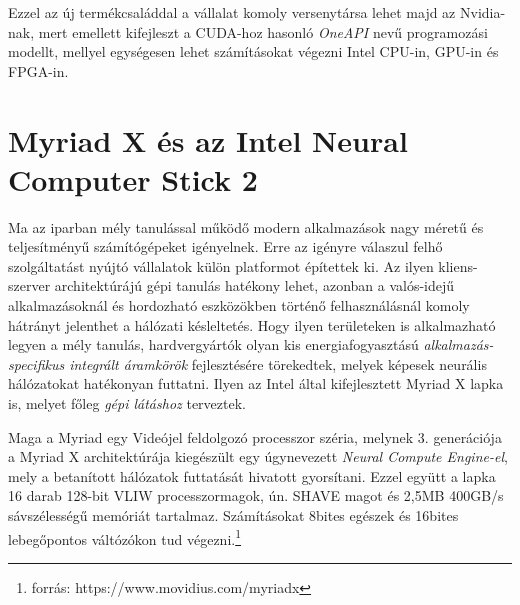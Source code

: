 Ezzel az új termékcsaláddal a vállalat komoly versenytársa lehet majd az Nvidia-nak, mert emellett kifejleszt a CUDA-hoz hasonló \emph{OneAPI} nevű programozási modellt, mellyel egységesen lehet számításokat végezni Intel CPU-in, GPU-in és FPGA-in.\cite{patrizio-networkworld}

\section{Myriad X és az Intel Neural Computer Stick 2}
Ma az iparban mély tanulással működő modern alkalmazások nagy méretű és teljesítményű számítógépeket igényelnek. Erre az igényre válaszul felhő szolgáltatást nyújtó vállalatok külön platformot építettek ki. Az ilyen kliens-szerver architektúrájú gépi tanulás hatékony lehet, azonban a valós-idejű alkalmazásoknál és hordozható eszközökben történő felhasználásnál komoly hátrányt jelenthet a hálózati késleltetés. Hogy ilyen területeken is alkalmazható legyen a mély tanulás, hardvergyártók olyan kis energiafogyasztású \emph{alkalmazás-specifikus integrált áramkörök} fejlesztésére törekedtek, melyek képesek neurális hálózatokat hatékonyan futtatni. Ilyen az Intel által kifejlesztett Myriad X lapka is, melyet főleg \emph{gépi látáshoz} terveztek.

Maga a Myriad egy Videójel feldolgozó processzor széria, melynek 3. generációja a Myriad X architektúrája kiegészült egy úgynevezett \emph{Neural Compute Engine-el}, mely a betanított hálózatok futtatását hivatott gyorsítani. Ezzel együtt a lapka 16 darab 128-bit VLIW processzormagok, ún. SHAVE magot és 2,5MB 400GB/s sávszélességű memóriát tartalmaz. Számításokat 8bites egészek és 16bites lebegőpontos váltózókon tud végezni.\footnote{forrás: https://www.movidius.com/myriadx} 

